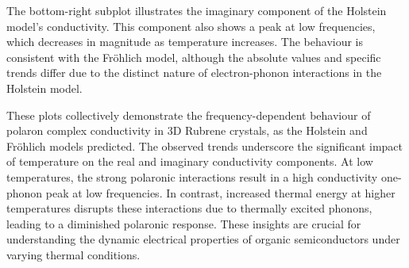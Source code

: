 The bottom-right subplot illustrates the imaginary component of the Holstein model's conductivity. This component also shows a peak at low frequencies, which decreases in magnitude as temperature increases. The behaviour is consistent with the Fr\"ohlich model, although the absolute values and specific trends differ due to the distinct nature of electron-phonon interactions in the Holstein model.

These plots collectively demonstrate the frequency-dependent behaviour of polaron complex conductivity in 3D Rubrene crystals, as the Holstein and Fr\"ohlich models predicted. The observed trends underscore the significant impact of temperature on the real and imaginary conductivity components. At low temperatures, the strong polaronic interactions result in a high conductivity one-phonon peak at low frequencies. In contrast, increased thermal energy at higher temperatures disrupts these interactions due to thermally excited phonons, leading to a diminished polaronic response. These insights are crucial for understanding the dynamic electrical properties of organic semiconductors under varying thermal conditions.




